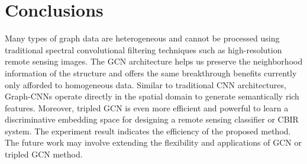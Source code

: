 \documentclass[11pt]{article}
\begin{document}
\section{Conclusions}
Many types of graph data are heterogeneous and cannot be processed using traditional spectral convolutional filtering techniques such as high-resolution remote sensing images. The GCN architecture helps us preserve the neighborhood information of the structure and offers the same breakthrough benefits currently only afforded to homogeneous data. Similar to traditional CNN architectures, Graph-CNNs operate directly in the spatial domain to generate semantically rich features. Moreover, tripled GCN is even more efficient and powerful to learn a discriminative embedding space for designing a remote sensing classifier or CBIR system. The experiment result indicates the efficiency of the proposed method. The future work may involve extending the flexibility and applications of GCN or tripled GCN method.
\newpage


\end{document}
